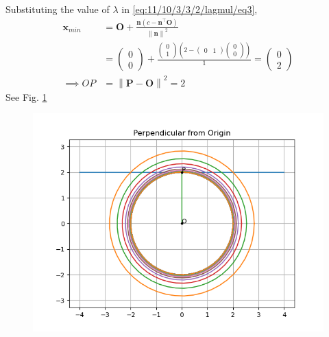 \documentclass[12pt]{article}
\providecommand{\brak}[1]{\ensuremath{\left(#1\right)}}
\providecommand{\norm}[1]{\left\lVert#1\right\rVert}
\newcommand{\myvec}[1]{\ensuremath{\begin{pmatrix}#1\end{pmatrix}}}
\let\vec\mathbf
\begin{document}
Substituting the value of $\lambda$ in \eqref{eq:11/10/3/3/2/lagmul/eq3},
\begin{align}
	\vec{x}_{min} &=  \vec{O}+\frac{\vec{n}\brak{c-\vec{n}^\top\vec{O}}}{\norm{\vec{n}}^2}
	\\
	&= \myvec{0\\0}+ \frac{\myvec{0\\1}\brak{2-\myvec{0&1}\myvec{0\\0}}}{1}
	= \myvec{0\\2}\\
	\implies OP &= \norm{\vec{P}-\vec{O}}^2
	= 2
\end{align}
See Fig. \ref{fig:11/10/3/3/2/lagmul/Fig1}
\begin{figure}[!h]
	\begin{center} 
	    \includegraphics[width=\columnwidth]{11/10/3/3/2/lagmul/figs/opt3}
	\end{center}
\caption{}
\label{fig:11/10/3/3/2/lagmul/Fig1}
\end{figure}
\end{document}
